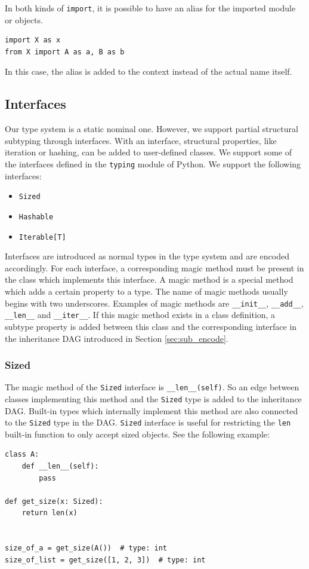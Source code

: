 In both kinds of \lstinline|import|, it is possible to have an alias for the imported module or objects.
\begin{lstlisting}
import X as x
from X import A as a, B as b
\end{lstlisting}
In this case, the alias is added to the context instead of the actual name itself.

\subsection{Interfaces}
Our type system is a static nominal one. However, we support partial structural subtyping through interfaces. With an interface, structural properties, like iteration or hashing, can be added to user-defined classes. We support some of the interfaces defined in the \lstinline|typing| module of Python. We support the following interfaces:
\begin{itemize}
\item \lstinline|Sized|
\item \lstinline|Hashable|
\item \lstinline|Iterable[T]|
\end{itemize}

Interfaces are introduced as normal types in the type system and are encoded accordingly. For each interface, a corresponding magic method must be present in the class which implements this interface. A magic method is a special method which adds a certain property to a type. The name of magic methods usually begins with two underscores. Examples of magic methods are \lstinline|__init__|, \lstinline|__add__|, \lstinline|__len__| and \lstinline|__iter__|. If this magic method exists in a class definition, a subtype property is added between this class and the corresponding interface in the inheritance DAG introduced in Section \ref{sec:sub_encode}.

\subsubsection{Sized}
The magic method of the \lstinline|Sized| interface is \lstinline|__len__(self)|. So an edge between classes implementing this method and the \lstinline|Sized| type is added to the inheritance DAG. Built-in types which internally implement this method are also connected to the \lstinline|Sized| type in the DAG. \lstinline|Sized| interface is useful for restricting the \lstinline|len| built-in function to only accept sized objects. See the following example:
\begin{lstlisting}
class A:
	def __len__(self):
		pass
		
def get_size(x: Sized):
	return len(x)
	

size_of_a = get_size(A())  # type: int
size_of_list = get_size([1, 2, 3])  # type: int
\end{lstlisting}

